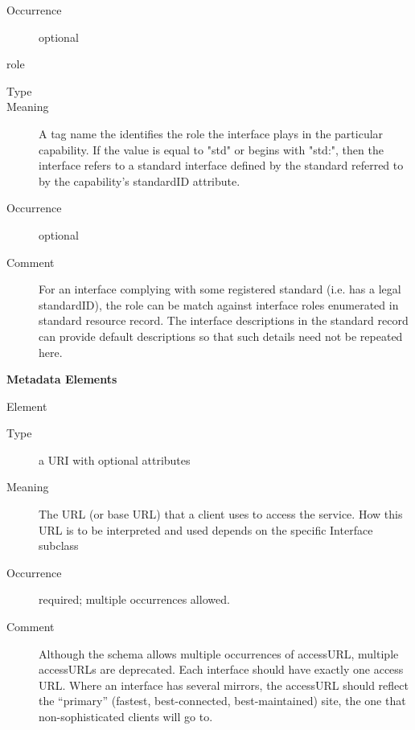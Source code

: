 \documentclass[11pt,a4paper]{ivoa}
\begin{document}
\begin{generated}
\begin{bigdescription}
\begin{description}
\item[Occurrence] optional
\end{description}
\item[role]
\begin{description}
\item[Type] 
\item[Meaning] 
               A tag name the identifies the role the interface plays
               in the particular capability.  If the value is equal to
               {"}std{"} or begins with {"}std:{"}, then the interface refers
               to a standard interface defined by the standard
               referred to by the capability's standardID attribute.  
            
\item[Occurrence] optional
\item[Comment] 
               For an interface complying with some registered
               standard (i.e. has a legal standardID), the role can be
               match against interface roles enumerated in standard 
               resource record.  The interface descriptions in
               the standard record can provide default descriptions 
               so that such details need not be repeated here.  
            
\end{description}


\end{bigdescription}\endgroup



\vspace{0.5ex}\noindent\textbf{ Metadata Elements}

\begingroup\small\begin{bigdescription}\item[Element \xmlel{accessURL}]
\begin{description}
\item[Type] a URI with optional attributes
\item[Meaning] 
                 The URL (or base URL) that a client uses to access the
                 service.  How this URL is to be interpreted and used 
                 depends on the specific Interface subclass
               
\item[Occurrence] required; multiple occurrences allowed.
\item[Comment] 
                 Although the schema allows multiple occurrences of
                 accessURL, multiple accessURLs are deprecated.  Each
                 interface should have exactly one access URL.  Where an
                 interface has several mirrors, the  accessURL should
                 reflect the “primary” (fastest, best-connected, 
                 best-maintained) site, the one that non-sophisticated
                 clients will go to.


\end{description}
\end{bigdescription}
\end{generated}
\end{document}
